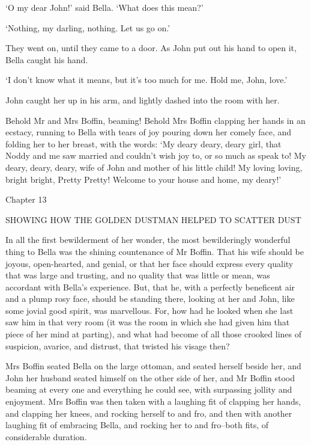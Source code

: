 ‘O my dear John!’ said Bella. ‘What does this mean?’

‘Nothing, my darling, nothing. Let us go on.’

They went on, until they came to a door. As John put out his hand to
open it, Bella caught his hand.

‘I don’t know what it means, but it’s too much for me. Hold me, John,
love.’

John caught her up in his arm, and lightly dashed into the room with
her.

Behold Mr and Mrs Boffin, beaming! Behold Mrs Boffin clapping her hands
in an ecstacy, running to Bella with tears of joy pouring down her
comely face, and folding her to her breast, with the words: ‘My deary
deary, deary girl, that Noddy and me saw married and couldn’t wish joy
to, or so much as speak to! My deary, deary, deary, wife of John and
mother of his little child! My loving loving, bright bright, Pretty
Pretty! Welcome to your house and home, my deary!’



Chapter 13

SHOWING HOW THE GOLDEN DUSTMAN HELPED TO SCATTER DUST


In all the first bewilderment of her wonder, the most bewilderingly
wonderful thing to Bella was the shining countenance of Mr Boffin. That
his wife should be joyous, open-hearted, and genial, or that her face
should express every quality that was large and trusting, and no quality
that was little or mean, was accordant with Bella’s experience. But,
that he, with a perfectly beneficent air and a plump rosy face, should
be standing there, looking at her and John, like some jovial good
spirit, was marvellous. For, how had he looked when she last saw him in
that very room (it was the room in which she had given him that piece of
her mind at parting), and what had become of all those crooked lines of
suspicion, avarice, and distrust, that twisted his visage then?

Mrs Boffin seated Bella on the large ottoman, and seated herself beside
her, and John her husband seated himself on the other side of her, and
Mr Boffin stood beaming at every one and everything he could see, with
surpassing jollity and enjoyment. Mrs Boffin was then taken with a
laughing fit of clapping her hands, and clapping her knees, and rocking
herself to and fro, and then with another laughing fit of embracing
Bella, and rocking her to and fro--both fits, of considerable duration.

